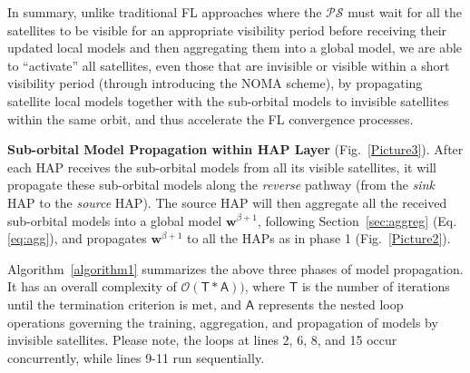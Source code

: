 \documentclass[letter,journal]{IEEEtran}
\newcommand{\fref}[1]{Fig.~\ref{#1}}
\begin{document}
In summary, unlike traditional FL approaches where the $\mathcal {PS}$ must wait for all the satellites to be visible for an appropriate visibility period before receiving their updated local models and then aggregating them into a global model, we are able to ``activate'' all satellites, even those that are invisible or visible within a short visibility period (through introducing the NOMA scheme), by propagating satellite local models together with the sub-orbital models to invisible satellites within the same orbit, and thus accelerate the FL convergence processes.


{\bf Sub-orbital Model Propagation within HAP Layer} (Fig.~\ref{Picture3}).
After each HAP receives the sub-orbital models from all its visible satellites, it will propagate these sub-orbital models along the \textit{reverse} pathway (from the \textit{sink} HAP to the \textit{source} HAP). The source HAP will then aggregate all the received sub-orbital models into a global model $\boldsymbol{w}^{\beta+1}$, following Section~\ref{sec:aggreg} (Eq. \ref{eq:agg}), and propagates $\boldsymbol{w}^{\beta+1}$ to all the HAPs as in phase 1 (\fref{Picture2}).

Algorithm~\ref{algorithm1} summarizes the above three phases of model propagation. It has an overall complexity of $\mathcal{O}(\mathsf{T}*\mathsf{A}))$, where $\mathsf{T}$ is the number of iterations until the termination criterion is met, and $\mathsf{A}$ represents the nested loop operations governing the training, aggregation, and propagation of models by invisible satellites. Please note, the loops at lines 2, 6, 8, and 15 occur concurrently, while lines  9-11 run sequentially.



\begin{algorithm}[!t]
\caption{\small NomaFedHAP model aggregation algorithm}\label{algorithm2}

\end{algorithm}
\end{document}
